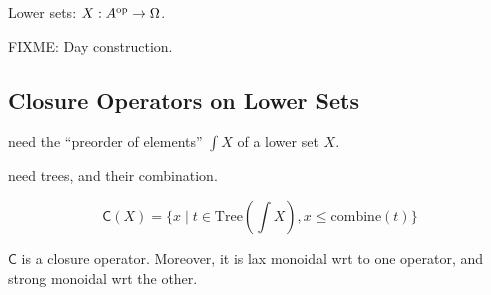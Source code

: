 Lower sets: $X : A^{\mathrm{op}} \to \Omega$.

\begin{proposition}
  FIXME: Day construction.
\end{proposition}

\subsection{Closure Operators on Lower Sets}

need the ``preorder of elements'' $\int X$ of a lower set $X$.

need trees, and their combination.


\begin{displaymath}
  \mathsf{C}(X) = \{ x \mid t \in \mathrm{Tree}(\int X), x \leq \mathrm{combine}(t) \}
\end{displaymath}

\begin{theorem}
  $\mathsf{C}$ is a closure operator. Moreover, it is lax monoidal wrt
  to one operator, and strong monoidal wrt the other.
\end{theorem}
